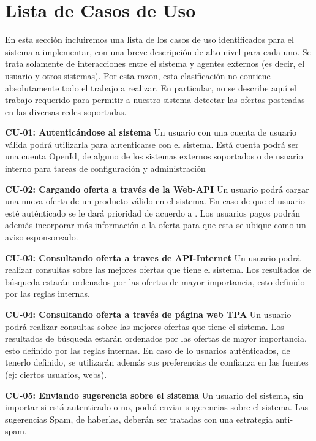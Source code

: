 \section*{Lista de Casos de Uso}
 En esta sección incluiremos una lista de los casos de uso identificados para el sistema a implementar, con una breve descripción de alto nivel para cada uno. Se trata solamente de interacciones entre el sistema y agentes externos (es decir, el usuario y otros sistemas). Por esta razon, esta clasificación no contiene absolutamente todo el trabajo a realizar.  
    En particular, no se describe aquí el trabajo requerido para permitir a nuestro sistema detectar las ofertas posteadas en las diversas redes soportadas. 

\textbf{CU-01: Autenticándose al sistema} Un usuario con una cuenta de usuario válida podrá utilizarla para autenticarse con el sistema. Está cuenta podrá ser una cuenta OpenId, de alguno de los sistemas externos soportados o de usuario interno para tareas de configuración y administración

\textbf{CU-02: Cargando oferta a través de la Web-API} Un usuario podrá cargar una nueva oferta de un producto válido en el sistema. En caso de que el usuario esté auténticado se le dará prioridad de acuerdo a . Los usuarios pagos podrán además incorporar más información a la oferta para que esta se ubique como un aviso esponsoreado.

\textbf{CU-03: Consultando oferta a traves de API-Internet} Un usuario podrá realizar consultas sobre las mejores ofertas que tiene el sistema. Los resultados de búsqueda estarán ordenados por las ofertas de mayor importancia, esto definido por las reglas internas.

\textbf{CU-04: Consultando oferta a través de página web TPA} Un usuario podrá realizar consultas sobre las mejores ofertas que tiene el sistema. Los resultados de búsqueda estarán ordenados por las ofertas de mayor importancia, esto definido por las reglas internas. En caso de lo usuarios auténticados, de tenerlo definido, se utilizarán además sus preferencias de confianza en las fuentes (ej: ciertos usuarios, webs).

\textbf{CU-05: Enviando sugerencia sobre el sistema} Un usuario del sistema, sin importar si está autenticado o no, podrá enviar sugerencias sobre el sistema. Las sugerencias Spam, de haberlas, deberán ser tratadas con una estrategia anti-spam.
